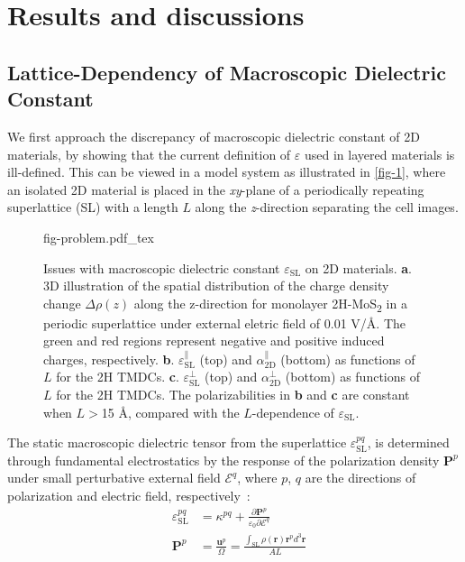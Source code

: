 
\section{Results and discussions}
\label{sec:diel-results-discussions}

\subsection{Lattice-Dependency of Macroscopic Dielectric Constant}
\label{sec:diel-latt-depend-macr}

We first approach the discrepancy of macroscopic dielectric constant
of 2D materials, by showing that the current definition of
$\varepsilon$ used in layered materials is ill-defined.  This can be
viewed in a model system as illustrated
in \autoref{fig-1}, where an isolated 2D material is placed in
the \textit{xy}-plane of a periodically repeating superlattice (SL)
with a length $L$ along the \textit{z}-direction separating the cell
images.%
\begin{figure}[!htbp]
\centering
{fig-problem.pdf_tex}
\caption{\label{fig-1} %
  Issues with macroscopic dielectric constant
  $\varepsilon_{\mathrm{SL}}$ on 2D materials.  \textbf{a}. 3D
  illustration of the spatial distribution of the charge density
  change $\Delta \rho(z)$ along the z-direction for monolayer
  2H-MoS\textsubscript{2} in a periodic superlattice under external
  eletric field of 0.01 V/\AA{}.  The green and red regions represent
  negative and positive induced charges, respectively.
  \textbf{b}.  $\varepsilon^{\parallel}_{\mathrm{SL}}$ (top) and
  $\alpha_{\mathrm{2D}}^{\parallel}$ (bottom) as functions of $L$ for
  the 2H TMDCs. \textbf{c}.  $\varepsilon^{\perp}_{\mathrm{SL}}$ (top)
  and $\alpha_{\mathrm{2D}}^{\perp}$ (bottom) as functions of $L$ for
  the 2H TMDCs. The polarizabilities in \textbf{b} and \textbf{c} are
  constant when $L>$15 \AA{}, compared with the $L$-dependence of
  $\varepsilon_{\mathrm{SL}}$. }
\end{figure}
%
The static macroscopic dielectric tensor from the superlattice
$\varepsilon_{\mathrm{SL}}^{pq}$, is determined through fundamental
electrostatics by the response of the polarization density
$\symbf{P}^{p}$ under small perturbative external field
$\mathscr{E}^{q}$, where $p$, $q$ are the directions of
polarization and electric field,
respectively~\autocite{Dressel_2001_electrodynamics}:
\begin{subequations}
  \begin{eqnarray}
      \label{eq:diele-def-eps-1}
    &\varepsilon_{\mathrm{SL}}^{pq} &= \kappa^{pq} +
                                 {\displaystyle \frac{\partial \symbf{P}^{p}}
                                 {\varepsilon_{0} \partial \mathscr{E}^{q}}} \\
          \label{eq:diele-def-eps-2}
    &\symbf{P}^{p} &=  {\displaystyle \frac{\symbf{u}^{p}}{\Omega}}
                          = {\displaystyle \frac{{\displaystyle
          \int_{\mathrm{SL}} \rho(\symbf{r}) \symbf{r}^{p} d^{3}\symbf{r}}}
                          {AL}}
  \end{eqnarray}
\end{subequations}
